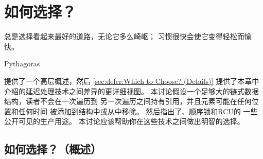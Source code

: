 
\section{如何选择？}
\label{sec:defer:Which to Choose?}
%
\epigraph{总是选择看起来最好的道路，无论它多么崎岖；
	  习惯很快会使它变得轻松而愉快。}
	  {Pythagoras}

提供了一个高层概述，然后
\cref{sec:defer:Which to Choose? (Details)}
提供了本章中介绍的延迟处理技术之间差异的更详细视图。
本讨论假设一个足够大的链式数据结构，读者不会在一次遍历到
另一次遍历之间持有引用，并且元素可能在任何位置和任何时间
被添加到结构中或从中移除。
然后指出了、顺序锁和RCU的
一些公开可见的生产用途\@。
本讨论应该帮助你在这些技术之间做出明智的选择。

\subsection{如何选择？（概述）}
\label{sec:defer:Which to Choose? (Overview)}

\begin{table}
\renewcommand*{\arraystretch}{1.25}
\footnotesize
\centering\OneColumnHSpace{-.3in}
\caption{选择哪种延迟处理技术？（概述）}
\label{tab:defer:Which Deferred Technique to Choose? (Overview)}
\end{table}

